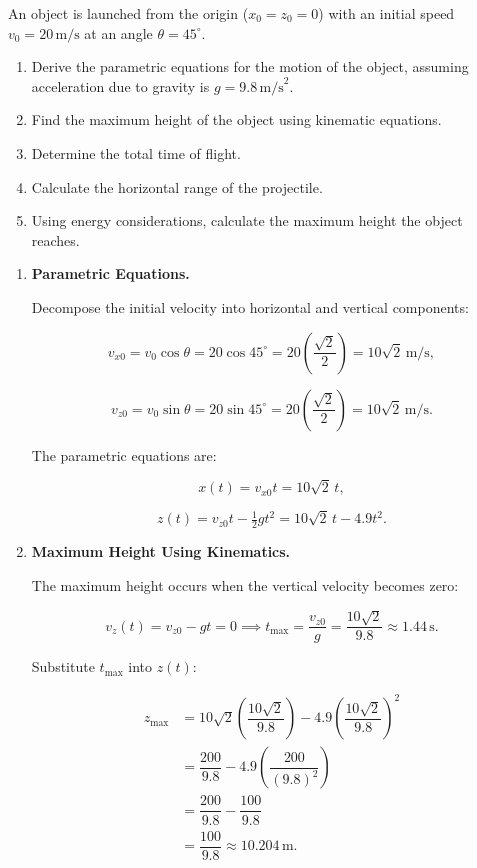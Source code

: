 \exampleline
\begin{example}
An object is launched from the origin (\( x_0 = z_0 = 0 \)) with an initial speed \( v_0 = 20 \, \text{m/s} \) at an angle \( \theta = 45^\circ \). 

\begin{enumerate}
    \item Derive the parametric equations for the motion of the object, assuming acceleration due to gravity is \( g = 9.8 \, \text{m/s}^2 \).
    \item Find the maximum height of the object using kinematic equations.
    \item Determine the total time of flight.
    \item Calculate the horizontal range of the projectile.
    \item Using energy considerations, calculate the maximum height the object reaches.
\end{enumerate}

\begin{solution}
\begin{enumerate}
    \item \textbf{Parametric Equations.}
    
    Decompose the initial velocity into horizontal and vertical components:
    
    \[
    v_{x0} = v_0 \cos \theta = 20 \cos 45^\circ = 20 \left( \frac{\sqrt{2}}{2} \right) = 10\sqrt{2} \, \text{m/s},
    \]
    
    \[
    v_{z0} = v_0 \sin \theta = 20 \sin 45^\circ = 20 \left( \frac{\sqrt{2}}{2} \right) = 10\sqrt{2} \, \text{m/s}.
    \]
    
    The parametric equations are:
    
    \[
    x(t) = v_{x0} t = 10\sqrt{2} \, t,
    \]
    
    \[
    z(t) = v_{z0} t - \tfrac{1}{2} g t^2 = 10\sqrt{2} \, t - 4.9 t^2.
    \]
    
    \item \textbf{Maximum Height Using Kinematics.}
    
    The maximum height occurs when the vertical velocity becomes zero:
    
    \[
    v_z(t) = v_{z0} - g t = 0 \implies t_{\text{max}} = \dfrac{v_{z0}}{g} = \dfrac{10\sqrt{2}}{9.8} \approx 1.44 \, \text{s}.
    \]
    
    Substitute \( t_{\text{max}} \) into \( z(t) \):
    
    \[
    \begin{aligned}
    z_{\text{max}} &= 10\sqrt{2} \left( \dfrac{10\sqrt{2}}{9.8} \right) - 4.9 \left( \dfrac{10\sqrt{2}}{9.8} \right)^2 \\
    &= \dfrac{200}{9.8} - 4.9 \left( \dfrac{200}{(9.8)^2} \right) \\
    &= \dfrac{200}{9.8} - \dfrac{100}{9.8} \\
    &= \dfrac{100}{9.8} \approx 10.204 \, \text{m}.
    \end{aligned}
    \]
    

\end{enumerate}
\end{solution}
\end{example}
